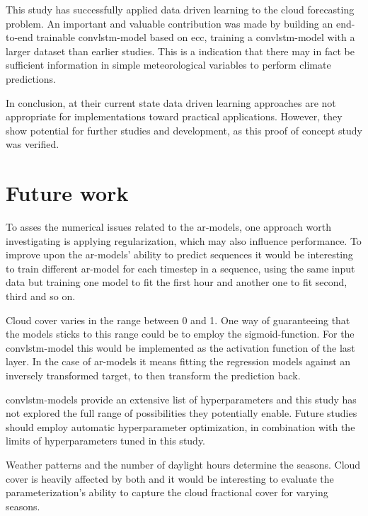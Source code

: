 This study has successfully applied data driven learning to the cloud forecasting problem. An important and valuable contribution was made by building an end-to-end trainable \acrshort{convlstm}-model based on \acrshort{ecc}, training a \acrshort{convlstm}-model with a larger dataset than earlier studies. This is a indication that there may in fact be sufficient information in simple meteorological variables to perform climate predictions. 

In conclusion, at their current state data driven learning approaches are not appropriate for implementations toward practical applications. However, they show potential for further studies and development, as this proof of concept study was verified.

\section{Future work}
To asses the numerical issues related to the \acrshort{ar}-models, one approach worth investigating is applying regularization, which may also influence performance. To improve upon the \acrshort{ar}-models' ability to predict sequences it would be interesting to train different \acrshort{ar}-model for each timestep in a sequence, using the same input data but training one model to fit the first hour and another one to fit second, third and so on.

Cloud cover varies in the range between 0 and 1. One way of guaranteeing that the models sticks to this range could be to employ the sigmoid-function. For the \acrshort{convlstm}-model this would be implemented as the activation function of the last layer. In the case of \acrshort{ar}-models it means fitting the regression models against an inversely transformed target, to then transform the prediction back.

\acrshort{convlstm}-models provide an extensive list of hyperparameters and this study has not explored the full range of possibilities they potentially enable. Future studies should employ automatic hyperparameter optimization, in combination with the limits of hyperparameters tuned in this study.  

Weather patterns and the number of daylight hours determine the seasons. Cloud cover is heavily affected by both and it would be interesting to evaluate the parameterization's ability to capture the cloud fractional cover for varying seasons. 

